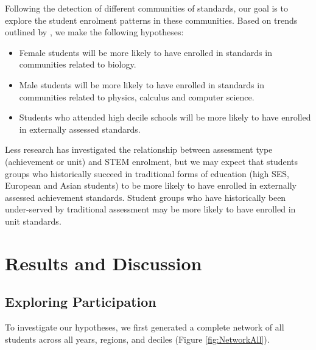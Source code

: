 Following the detection of different communities of standards, our goal is to explore the student enrolment patterns in these communities. Based on trends outlined by \citet{EducationCounts_2018}, we make the following hypotheses:
\begin{itemize}
    \item Female students will be more likely to have enrolled in standards in communities related to biology.
    \item Male students will be more likely to have enrolled in standards in communities related to physics, calculus and computer science.
    \item Students who attended high decile schools will be more likely to have enrolled in externally assessed standards.
\end{itemize}
Less research has investigated the relationship between assessment type (achievement or unit) and STEM enrolment, but we may expect that students groups who historically succeed in traditional forms of education (high SES, European and Asian students) to be more likely to have enrolled in externally assessed achievement standards. Student groups who have historically been under-served by traditional assessment may be more likely to have enrolled in unit standards. 




\section{Results and Discussion}
\subsection{Exploring Participation}
To investigate our hypotheses, we first generated a complete network of all students across all years, regions, and deciles (Figure \ref{fig:NetworkAll}).


